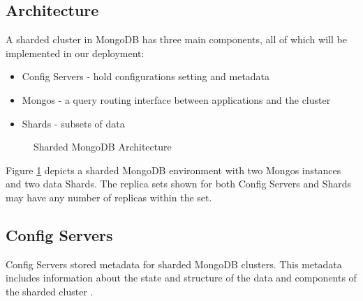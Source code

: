 \documentclass[9pt,twocolumn,twoside]{../../styles/osajnl}
\begin{document}
\subsection{Architecture}

A sharded cluster in MongoDB has three main components, all of which will be implemented in our deployment:

\begin{itemize}
\item Config Servers - hold configurations setting and metadata
\item Mongos - a query routing interface between applications and the cluster
\item Shards - subsets of data
\end{itemize}

\begin{figure}[htbp]
\centering
{}
\caption{Sharded MongoDB Architecture \cite{www-mongoComponents}}
\label{fig:mongodb-arch}
\end{figure}


Figure \ref{fig:mongodb-arch} depicts a sharded MongoDB environment with two Mongos instances and two data Shards.  The replica sets shown for both Config Servers and Shards may have any number of replicas within the set.

\subsection{Config Servers}

Config Servers stored metadata for sharded MongoDB clusters.  This metadata includes information about the state and structure of the data and components of the sharded cluster \cite{www-mongoConfig}.
\end{document}
